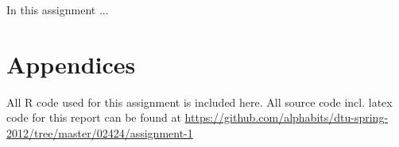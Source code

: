 \def\assignmenttitle{Assignment 1}
\def\assignmentnumber{1}
\def\assignmentdate{10-03-2012}
\def\githuburl{\small\url{https://github.com/alphabits/dtu-spring-2012/tree/master/02424/assignment-1}}
\def\githuburlfoot{\footnotesize\url{https://github.com/alphabits/dtu-spring-2012/tree/master/02424/assignment-1}}





\maketitle

In this assignment ...

\FloatBarrier

\pagebreak

\renewcommand\thesection{\Alph{section}}
\section{Appendices}

All R code used for this assignment is included here. All source code incl.
latex code for this report can be found at \githuburl

\pagebreak

\nocite{madsen11}




